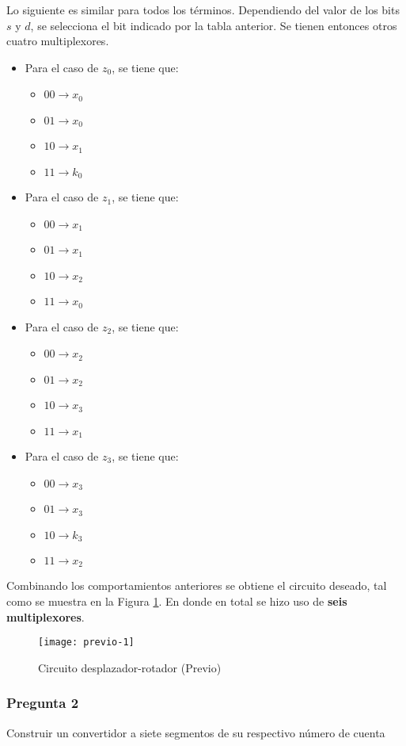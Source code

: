 \documentclass[../procedimientos.tex]{subfiles}
\begin{document}
Lo siguiente es similar para todos los términos. Dependiendo del valor de los 
bits $s$ y $d$, se selecciona el bit indicado por la tabla anterior. Se tienen 
entonces otros cuatro multiplexores.
\begin{itemize}
  \item Para el caso de $z_0$, se tiene que:
    \begin{itemize}
      \item $00 \rightarrow x_0$
      \item $01 \rightarrow x_0$
      \item $10 \rightarrow x_1$
      \item $11 \rightarrow k_0$
    \end{itemize}
  \item Para el caso de $z_1$, se tiene que:
    \begin{itemize}
      \item $00 \rightarrow x_1$
      \item $01 \rightarrow x_1$
      \item $10 \rightarrow x_2$
      \item $11 \rightarrow x_0$
    \end{itemize}
  \item Para el caso de $z_2$, se tiene que:
    \begin{itemize}
      \item $00 \rightarrow x_2$
      \item $01 \rightarrow x_2$
      \item $10 \rightarrow x_3$
      \item $11 \rightarrow x_1$
    \end{itemize}
  \item Para el caso de $z_3$, se tiene que:
    \begin{itemize}
      \item $00 \rightarrow x_3$
      \item $01 \rightarrow x_3$
      \item $10 \rightarrow k_3$
      \item $11 \rightarrow x_2$
    \end{itemize}
\end{itemize}

Combinando los comportamientos anteriores se obtiene el circuito deseado, tal 
como se muestra en la Figura \ref{fig:previo1}. En donde en total se hizo uso 
de \textbf{seis multiplexores}.
\begin{figure}[H]
  \centering
  \texttt{[image: previo-1]}
  \caption{Circuito desplazador-rotador (Previo)}
  \label{fig:previo1}
\end{figure}

\subsubsection*{Pregunta 2}
\begin{em}
  Construir un convertidor a siete segmentos de su respectivo número de cuenta
\end{em}
\end{document}
